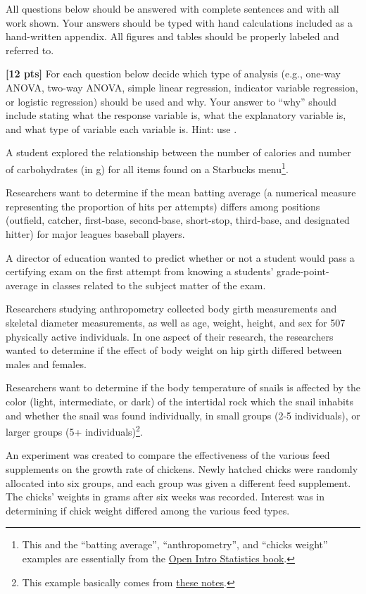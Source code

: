 \documentclass[10pt,openany]{book}\usepackage[]{graphicx}\usepackage[]{color}
\begin{document}
\newpage
\begin{hwsection}{All questions below should be answered with complete sentences and with all work shown.  Your answers should be typed with hand calculations included as a hand-written appendix.  All figures and tables should be properly labeled and referred to.}

  \item \label{hwprob:LMFoundWhich} \textbf{[12 pts]} For each question below decide which type of analysis (e.g., one-way ANOVA, two-way ANOVA, simple linear regression, indicator variable regression, or logistic regression) should be used and why.  Your answer to ``why'' should include stating what the response variable is, what the explanatory variable is, and what type of variable each variable is.  Hint: use .
    \begin{Enumerate}
      \item A student explored the relationship between the number of calories and number of carbohydrates (in g) for all items found on a Starbucks menu\footnote{This and the ``batting average'', ``anthropometry'', and ``chicks weight'' examples are essentially from the \href{http://www.openintro.org/stat/index.php}{Open Intro Statistics book}.}.
      \item Researchers want to determine if the mean batting average (a numerical measure representing the proportion of hits per attempts) differs among positions (outfield, catcher, first-base, second-base, short-stop, third-base, and designated hitter) for major leagues baseball players.
      \item A director of education wanted to predict whether or not a student would pass a certifying exam on the first attempt from knowing a students' grade-point-average in classes related to the subject matter of the exam.
      \item Researchers studying anthropometry collected body girth measurements and skeletal diameter measurements, as well as age, weight, height, and sex for 507 physically active individuals.  In one aspect of their research, the researchers wanted to determine if the effect of body weight on hip girth differed between males and females.
      \item Researchers want to determine if the body temperature of snails is affected by the color (light, intermediate, or dark) of the intertidal rock which the snail inhabits and whether the snail was found individually, in small groups (2-5 individuals), or larger groups (5+ individuals)\footnote{This example basically comes from \href{http://www.biology.hawaii.edu/301L/Spring/Labmanual/Lab 5 - Intertidal Ecology 11.pdf}{these notes}.}.
      \item An experiment was created to compare the effectiveness of the various feed supplements on the growth rate of chickens.  Newly hatched chicks were randomly allocated into six groups, and each group was given a different feed supplement.  The chicks' weights in grams after six weeks was recorded.  Interest was in determining if chick weight differed among the various feed types.
    \end{Enumerate}


\end{hwsection}
\end{document}
